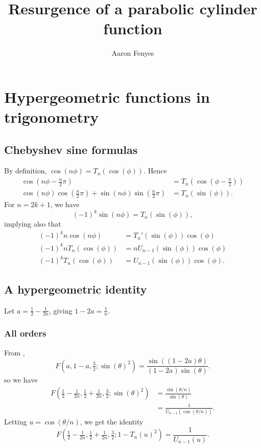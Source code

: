 \documentclass{article}
\title{Resurgence of a parabolic cylinder function}
\author{Aaron Fenyes}
\begin{document}
\maketitle
\section{Hypergeometric functions in trigonometry}
\subsection{Chebyshev sine formulas}
By definition, $\cos(n\phi) = T_n(\cos(\phi))$. Hence
\begin{align*}
\cos(n\phi - \tfrac{n}{2}\pi) & = T_n(\cos(\phi - \tfrac{\pi}{2})) \\
\cos(n\phi) \cos(\tfrac{n}{2}\pi) + \sin(n\phi) \sin(\tfrac{n}{2}\pi) & = T_n(\sin(\phi)).
\end{align*}
For $n = 2k + 1$, we have
\[ (-1)^k \sin(n\phi) = T_n(\sin(\phi)), \]
implying also that
\begin{align*}
(-1)^k n \cos(n\phi) & = T_n'(\sin(\phi)) \cos(\phi) \\
(-1)^k n T_n(\cos(\phi)) & = nU_{n-1}(\sin(\phi)) \cos(\phi) \\
(-1)^k T_n(\cos(\phi)) & = U_{n-1}(\sin(\phi)) \cos(\phi).
\end{align*}
\subsection{A hypergeometric identity}
Let $a = \tfrac{1}{2} - \tfrac{1}{2n}$, giving $1 - 2a = \tfrac{1}{n}$.
\subsubsection{All orders}\label{all-orders}
From \cite[equation~15.4.16]{dlmf},
\[ F(a, 1-a, \tfrac{3}{2}; \sin(\theta)^2) = \frac{\sin((1-2a)\theta)}{(1-2a)\sin(\theta)}. \]
so we have
\begin{align*}
F\left(\tfrac{1}{2} - \tfrac{1}{2n}, \tfrac{1}{2} + \tfrac{1}{2n}, \tfrac{3}{2}; \sin(\theta)^2\right) & = \frac{\sin(\theta/n)}{\sin(\theta)} \\
& = \frac{1}{U_{n-1}(\cos(\theta/n))}.
\end{align*}
Letting $u = \cos(\theta/n)$, we get the identity
\[ F\left(\tfrac{1}{2} - \tfrac{1}{2n}, \tfrac{1}{2} + \tfrac{1}{2n}, \tfrac{3}{2}; 1 - T_n(u)^2\right) = \frac{1}{U_{n-1}(u)}. \]
\end{document}
